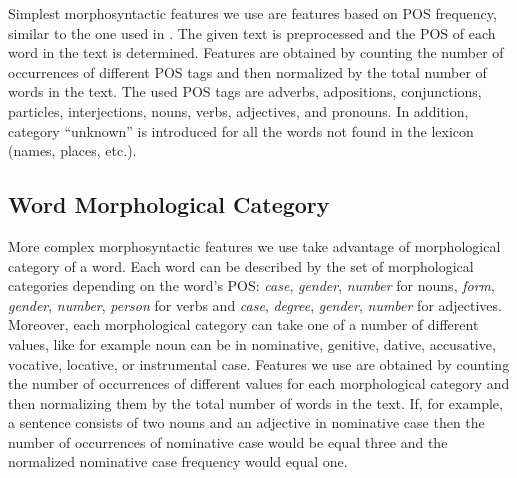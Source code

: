 \documentclass{llncs}
\begin{document}
Simplest morphosyntactic features we use are features based on POS frequency,
similar to the one used in \cite{kukushkina2001using}. The given text is
preprocessed and the POS of each word in the text is determined. Features are
obtained by counting the number of occurrences of different POS tags and then
normalized by the total number of words in the text. The used POS tags are
adverbs, adpositions, conjunctions, particles, interjections, nouns, verbs,
adjectives, and pronouns. In addition, category ``unknown'' is introduced for all
the words not found in the lexicon (names, places, etc.).

\subsection{Word Morphological Category}
\label{sec:morphosyntactic}

More complex morphosyntactic features we use take advantage of morphological
category of a word. Each word can be described by the set of morphological
categories depending on the word's POS: \emph{case}, \emph{gender}, \emph{number}
for nouns, \emph{form}, \emph{gender}, \emph{number}, \emph{person} for verbs and
\emph{case}, \emph{degree}, \emph{gender}, \emph{number} for adjectives.
Moreover, each morphological category can take one of a number of different
values, like for example noun can be in nominative, genitive, dative, accusative, vocative,
locative, or instrumental case. Features we use are obtained by counting the
number of occurrences of different values for each morphological category and
then normalizing them by the total number of words in the text. If, for example,
a sentence consists of two nouns and an adjective in nominative case then the
number of occurrences of nominative case would be equal three and the normalized
nominative case frequency would equal one.
\end{document}
